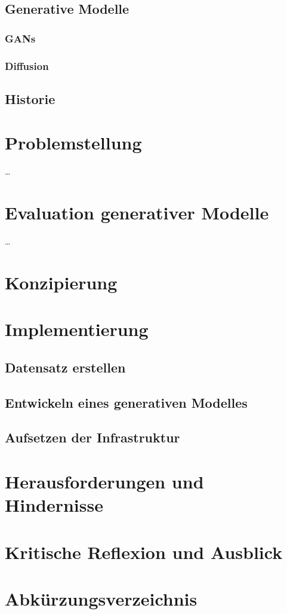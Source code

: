\documentclass[12pt,a4paper]{article}
\begin{document}
\subsection{Generative Modelle}
\subsubsection{GANs}
\subsubsection{Diffusion}
\subsection{Historie}

\section{Problemstellung}
\dots

\section{Evaluation generativer Modelle}
\dots

\section{Konzipierung}

\section{Implementierung}

\subsection{Datensatz erstellen}

\subsection{Entwickeln eines generativen Modelles}

\subsection{Aufsetzen der Infrastruktur}

\section{Herausforderungen und Hindernisse}

\section{Kritische Reflexion und Ausblick} 

\newpage

\section*{Abkürzungsverzeichnis}

\newpage
{}
\small
\printbibliography	
\end{document}
